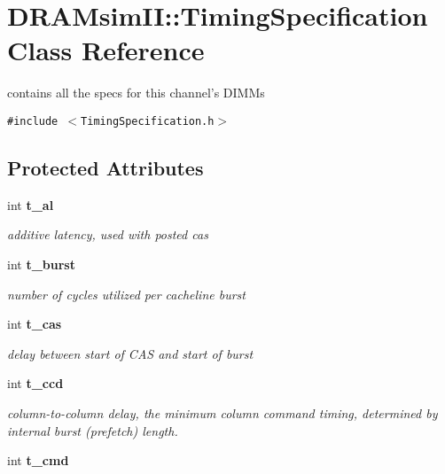 \section{DRAMsimII::TimingSpecification Class Reference}
\label{class_d_r_a_msim_i_i_1_1_timing_specification}
contains all the specs for this channel's DIMMs  


{\tt \#include $<$TimingSpecification.h$>$}

\subsection*{Protected Attributes}
\begin{CompactItemize}
\item 
int {\bf t\_\-al}\label{class_d_r_a_msim_i_i_1_1_timing_specification_f24fead42f8f704de507e20015049343}

\begin{CompactList}\small\item\em additive latency, used with posted cas \item\end{CompactList}\item 
int {\bf t\_\-burst}\label{class_d_r_a_msim_i_i_1_1_timing_specification_ca29997bd86855187f0335282f9f030d}

\begin{CompactList}\small\item\em number of cycles utilized per cacheline burst \item\end{CompactList}\item 
int {\bf t\_\-cas}\label{class_d_r_a_msim_i_i_1_1_timing_specification_86c477983b5afa89eef0b51b7ff4dec5}

\begin{CompactList}\small\item\em delay between start of CAS and start of burst \item\end{CompactList}\item 
int {\bf t\_\-ccd}\label{class_d_r_a_msim_i_i_1_1_timing_specification_518f0be3ee5548d981d22a6c70f27c7d}

\begin{CompactList}\small\item\em column-to-column delay, the minimum column command timing, determined by internal burst (prefetch) length. \item\end{CompactList}\item 
int {\bf t\_\-cmd}\label{class_d_r_a_msim_i_i_1_1_timing_specification_4b9b487fe4b01b0eaab793b650beed5a}


\end{CompactItemize}
